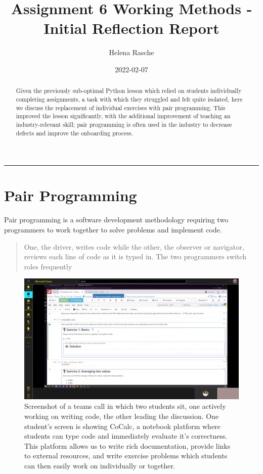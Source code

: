 \documentclass[paper=a4,justified,a4paper]{tufte-handout}
\title{Assignment 6 Working Methods - Initial Reflection Report}
\author{Helena Rasche}
\date{2022-02-07}
\begin{document}
\maketitle
\begin{abstract}
Given the previously sub-optimal Python lesson which relied on students
individually completing assignments, a task with which they struggled
and felt quite isolated, here we discuss the replacement of individual
exercises with pair programming. This improved the lesson significantly,
with the additional improvement of teaching an industry-relevant skill;
pair programming is often used in the industry to decrease defects and
improve the onboarding process.
\end{abstract}
\noindent\rule{5in}{0.4pt}


\hypertarget{pair-programming}{%
\section{Pair Programming}\label{pair-programming}}

Pair programming is a software development methodology requiring two
programmers to work together to solve problems and implement code.

\begin{quote}
One, the driver, writes code while the other, the observer or navigator,
reviews each line of code as it is typed in. The two programmers switch
roles frequently \citep{Williams}
\end{quote}

\begin{figure}
\centering
\includegraphics{sharing.png}
\caption{Screenshot of a teams call in which two students sit, one
actively working on writing code, the other leading the discussion. One
student's screen is showing CoCalc, a notebook platform where students
can type code and immediately evaluate it's correctness. This platform
allows us to write rich documentation, provide links to external
resources, and write exercise problems which students can then easily
work on individually or together.}
\end{figure}
\end{document}
